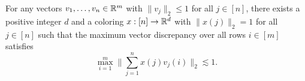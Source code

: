 
\begin{theorem} 
\label{thm:komlos-vec-disc}
For any vectors $v_1, \ldots, v_n \in \mathbb{R}^m$ with $\|v_j\|_2 \le 1$ for
all $j \in [n]$, there exists a positive integer $d$ and a coloring
$x:[n] \to \mathbb{R}^d$ with $\|x(j)\|_2 = 1$ for all $j \in [n]$ such that the maximum vector discrepancy over all rows $i\in [m]$ satisfies
\begin{equation}\label{eq:komlos-vec-disc}
  \max_{i = 1}^m \Bigg\|\sum_{j = 1}^n x(j) v_j(i) \Bigg\|_2 \lesssim 1.
\end{equation}
\end{theorem}
